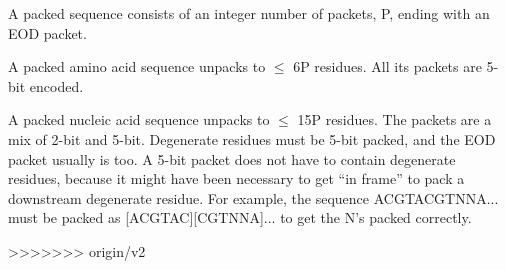 A packed sequence consists of an integer number of packets, P, ending
with an EOD packet.
 
A packed amino acid sequence unpacks to $\leq$ 6P residues. All its
packets are 5-bit encoded.
 
A packed nucleic acid sequence unpacks to $\leq$ 15P residues.  The
packets are a mix of 2-bit and 5-bit. Degenerate residues must be
5-bit packed, and the EOD packet usually is too. A 5-bit packet does
not have to contain degenerate residues, because it might have been
necessary to get ``in frame'' to pack a downstream degenerate
residue. For example, the sequence ACGTACGTNNA... must be packed as
[ACGTAC][CGTNNA]... to get the N's packed correctly.
 

>>>>>>> origin/v2
